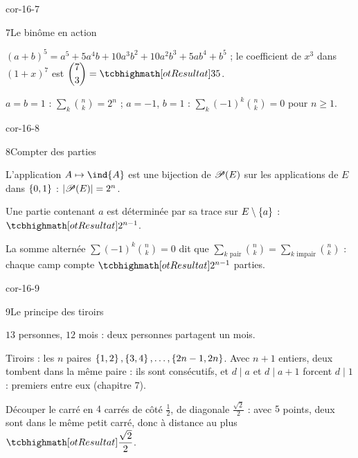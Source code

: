 \begin{blocLivre}{cor-16-7}
\begin{corrige}{7}{Le binôme en action}
\begin{questions}
  \item $(a+b)^{5}=a^{5}+5a^{4}b+10a^{3}b^{2}+10a^{2}b^{3}+5ab^{4}+b^{5}$ ;
    le coefficient de $x^{3}$ dans $(1+x)^{7}$ est
    $\dbinom73=\res{35}$.
  \item $a=b=1$ : $\displaystyle\sum_k\binom nk=2^{n}$ ;
    $a=-1$, $b=1$ :
    $\displaystyle\sum_k(-1)^{k}\binom nk=0$ pour $n\geqslant1$.
\end{questions}
\end{corrige}
\end{blocLivre}

\begin{blocLivre}{cor-16-8}
\begin{corrige}{8}{Compter des parties}
\begin{questions}
  \item L'application $A\mapsto\ind{A}$ est une bijection de
    $\mathscr{P}(E)$ sur les applications de $E$ dans $\left\{0,1\right\}$ :
    $|\mathscr{P}(E)|=2^{n}$.
  \item Une partie contenant $a$ est déterminée par sa trace sur
    $E\setminus\left\{a\right\}$ : $\res{2^{n-1}}$.
  \item La somme alternée $\sum(-1)^{k}\binom nk=0$ dit que
    $\sum_{k\text{ pair}}\binom nk=\sum_{k\text{ impair}}\binom nk$ :
    chaque camp compte $\res{2^{n-1}}$ parties.
\end{questions}
\end{corrige}
\end{blocLivre}

\begin{blocLivre}{cor-16-9}
\begin{corrige}{9}{Le principe des tiroirs}
\begin{questions}
  \item $13$ personnes, $12$ mois : deux personnes partagent un mois.
  \item Tiroirs : les $n$ paires $\left\{1,2\right\},\left\{3,4\right\},\dots,
    \left\{2n-1,2n\right\}$. Avec $n+1$ entiers, deux tombent dans la même paire :
    ils sont consécutifs, et $d\mid a$ et $d\mid a+1$ forcent $d\mid1$ :
    premiers entre eux (chapitre 7).
  \item Découper le carré en $4$ carrés de côté $\frac12$, de diagonale
    $\frac{\sqrt2}{2}$ : avec $5$ points, deux sont dans le même petit
    carré, donc à distance au plus $\res{\dfrac{\sqrt2}{2}}$.
\end{questions}
\end{corrige}
\end{blocLivre}

